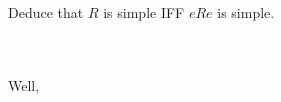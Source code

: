 Deduce that $R$ is simple IFF $eRe$ is simple.\\\\

\begin{solution}\renewcommand{\qedsymbol}{}\ \\
    Well,
\end{solution}